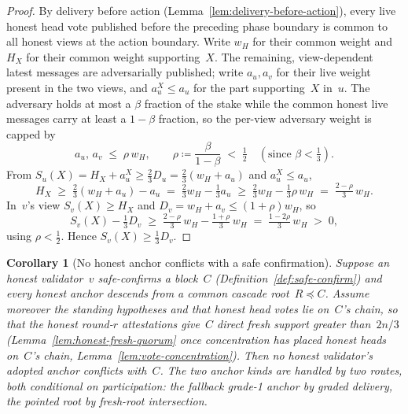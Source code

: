 \ifx\litemode\undefined\documentclass{article}\fi
\newcommand{\Supp}{\ensuremath{S}}          %
\newcommand{\Dvote}{\ensuremath{D}}         %
\theoremstyle{plain}
\newtheorem{corollary}{Corollary}
\theoremstyle{definition}
\theoremstyle{remark}
\begin{document}
\begin{proof}
By delivery before action (Lemma~\ref{lem:delivery-before-action}), every live
honest head vote published before the preceding phase boundary is common to all
honest views at the action boundary.  Write \(w_H\) for their common weight and
\(H_X\) for their common weight supporting~\(X\).  The remaining,
view-dependent latest messages are adversarially published; write \(a_u, a_v\)
for their live weight
present in the two views, and \(a_u^X \leq a_u\) for the part supporting~\(X\)
in~\(u\).  The adversary holds at most a \(\beta\) fraction of the stake while
the common honest live messages carry at least a \(1-\beta\)
fraction, so the per-view adversary weight is capped by
\[
  a_u,\, a_v \;\leq\; \rho\, w_H, \qquad \rho \coloneqq \frac{\beta}{1-\beta} \;<\; \tfrac12
  \quad(\text{since } \beta < \tfrac13).
\]
From \(\Supp_u(X) = H_X + a_u^X \geq \tfrac23\Dvote_u = \tfrac23(w_H + a_u)\) and
\(a_u^X \leq a_u\),
\[
  H_X \;\geq\; \tfrac23(w_H + a_u) - a_u \;=\; \tfrac23 w_H - \tfrac13 a_u
  \;\geq\; \tfrac23 w_H - \tfrac13 \rho\, w_H \;=\; \tfrac{2-\rho}{3}\, w_H .
\]
In~\(v\)'s view \(\Supp_v(X) \geq H_X\) and \(\Dvote_v = w_H + a_v \leq (1+\rho)w_H\),
so
\[
  \Supp_v(X) - \tfrac13\Dvote_v \;\geq\; \tfrac{2-\rho}{3}\,w_H - \tfrac{1+\rho}{3}\,w_H
  \;=\; \tfrac{1-2\rho}{3}\,w_H \;>\; 0,
\]
using \(\rho < \tfrac12\).  Hence \(\Supp_v(X) \geq \tfrac13\Dvote_v\).
\end{proof}

\begin{corollary}[No honest anchor conflicts with a safe confirmation]\label{cor:anchor-vs-safe}
Suppose an honest validator~\(v\) safe-confirms a block~\(C\)
(Definition~\ref{def:safe-confirm}) and every honest anchor descends from a common
cascade root~\(R \preceq C\).  Assume moreover the standing hypotheses and that
honest head votes lie on~\(C\)'s chain, so that the honest round-\(r\)
attestations give~\(C\) direct fresh support greater than~\(2n/3\)
(Lemma~\ref{lem:honest-fresh-quorum} once concentration has placed honest heads
on~\(C\)'s chain, Lemma~\ref{lem:vote-concentration}).  Then no
honest validator's adopted anchor conflicts with~\(C\).  The two anchor kinds are
handled by two routes, both \emph{conditional} on participation: the fallback
grade-1 anchor by graded delivery, the pointed root by fresh-root intersection.
\end{corollary}
\end{document}
